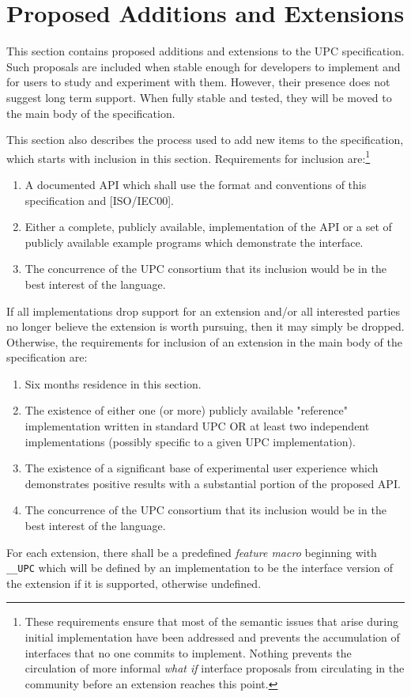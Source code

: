 \section{Proposed Additions and Extensions}

\np This section contains proposed additions and extensions to the UPC
    specification.  Such proposals are included when stable enough for
    developers to implement and for users to study and experiment with
    them.  However, their presence does not suggest long term support.
    When fully stable and tested, they will be moved to the main body of
    the specification.

\np This section also describes the process used to add new items to the
    specification, which starts with inclusion in this section.  Requirements
    for inclusion are:\footnote{These requirements ensure that most of
    the semantic issues that arise during initial implementation have
    been addressed and prevents the accumulation of interfaces that no
    one commits to implement. Nothing prevents the circulation of more
    informal {\em what if} interface proposals from circulating in the
    community before an extension reaches this point.}

\begin{enumerate}
\item A documented API which shall use the format and conventions of
    this specification and [ISO/IEC00].

\item Either a complete, publicly available, implementation of the API
    or a set of publicly available example programs which demonstrate
    the interface.
    
\item The concurrence of the UPC consortium that its inclusion would be
    in the best interest of the language.    
\end{enumerate}

\np If all implementations drop support for an extension and/or all interested parties
    no longer believe the extension is worth pursuing, then it may simply be dropped.
    Otherwise, the requirements for inclusion of an extension in the main body of the
    specification are:

\begin{enumerate}
\item Six months residence in this section.

\item The existence of either one (or more) publicly available "reference" implementation 
written in standard UPC OR at least two independent implementations (possibly specific 
to a given UPC implementation).

\item The existence of a significant base of experimental user experience
   which demonstrates positive results with a substantial portion of the
   proposed API.

\item The concurrence of the UPC consortium that its inclusion would be
    in the best interest of the language.
\end{enumerate}

\np For each extension, there shall be a predefined {\em feature macro}
   beginning with {\tt \_\_UPC} which will be defined by an implementation
   to be the interface version of the extension if it is supported, otherwise
   undefined.

